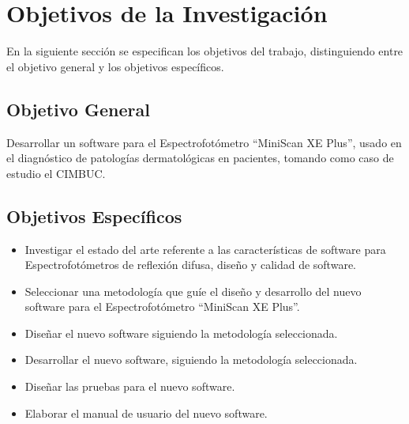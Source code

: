 	\section{Objetivos de la Investigaci\'{o}n}
En la siguiente secci\'{o}n se especifican los objetivos del trabajo, distinguiendo entre el objetivo general y los objetivos espec\'{i}ficos.
		\subsection{Objetivo General}
	Desarrollar un software para el Espectrofot\'{o}metro ``MiniScan XE Plus'', usado en el diagn\'{o}stico de patolog\'{i}as dermatol\'{o}gicas en pacientes, tomando como caso de estudio el CIMBUC.
		\subsection{Objetivos Espec\'{i}ficos}
			\begin{itemize}
				\item Investigar el estado del arte referente a las caracter\'{i}sticas de software para Espectrofot\'{o}metros de reflexi\'{o}n difusa, dise\~{n}o y calidad de software.
				\item Seleccionar una metodolog\'{i}a que gu\'{i}e el dise\~{n}o y desarrollo del nuevo software para el Espectrofot\'{o}metro ``MiniScan XE Plus''.
				\item Dise\~{n}ar el nuevo software siguiendo la metodolog\'{i}a seleccionada.
				\item Desarrollar el nuevo software, siguiendo la metodolog\'{i}a seleccionada.
				\item Dise\~{n}ar las pruebas para el nuevo software.
				\item Elaborar el manual de usuario del nuevo software.
			\end{itemize}